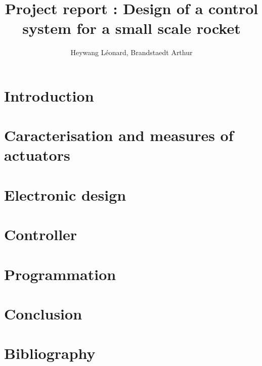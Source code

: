 \documentclass[twoside]{report}
\author{Heywang Léonard, Brandstaedt Arthur}
\title{Project report : Design of a control system for a small scale rocket}
\date{\DTMtoday}
\begin{document}



\tableofcontents
\listoffigures

\newpage
\chapter{Introduction}


\chapter{Caracterisation and measures of actuators}


\chapter{Electronic design}


\chapter{Controller}


\chapter{Programmation}


\chapter{Conclusion}


\chapter{Bibliography}
\printbibliography

\newpage
\appendix
\end{document}
